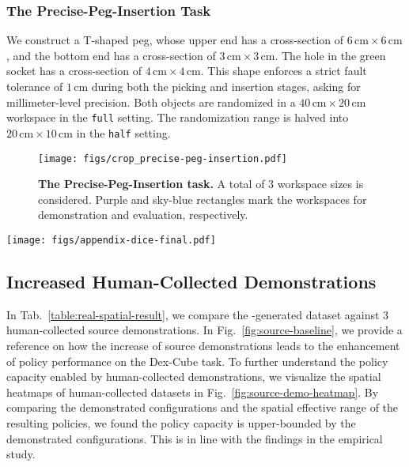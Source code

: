 \begin{appendix}
\vspace{0.2cm}\subsubsection{The Precise-Peg-Insertion Task} 
\label{sec:appendix-empirical-task}
We construct a T-shaped peg, whose upper end has a cross-section of $6\,\textrm{cm} \times 6\,\textrm{cm}$, and the bottom end has a cross-section of $3\,\textrm{cm} \times 3\,\textrm{cm}$. The hole in the green socket has a cross-section of $4\,\textrm{cm} \times 4\,\textrm{cm}$. This shape enforces a strict fault tolerance of $1\,\textrm{cm}$ during both the picking and insertion stages, asking for millimeter-level precision. Both objects are randomized in a $40\,\mathrm{cm} \times 20\,\mathrm{cm}$ workspace in the \texttt{full} setting. The randomization range is halved into $20\,\mathrm{cm} \times 10\,\mathrm{cm}$ in the \texttt{half} setting.


\begin{figure}[h]
    \centering
    \vspace{-0.1cm}
    \texttt{[image: figs/crop\_precise-peg-insertion.pdf]}
    \caption{\textbf{The Precise-Peg-Insertion task.} A total of $3$ workspace sizes is considered. Purple and sky-blue rectangles mark the workspaces for demonstration and evaluation, respectively.}
    \label{fig:precise-peg-insertion}
\end{figure}




\begin{figure*}[t]
    \centering
    \texttt{[image: figs/appendix-dice-final.pdf]}
    \caption{\textbf{Visualization of the policy performance trained on human-collected datasets.} (Upper row) The demonstrated configurations. (Bottom row) The spatial heatmaps with success rates averaged on $5$ trials.}
    \label{fig:source-demo-heatmap}
\end{figure*}



\subsection{Increased Human-Collected Demonstrations}
\label{sec:appendix-increase-source}

In Tab.~\ref{table:real-spatial-result}, we compare the \method-generated dataset against $3$ human-collected source demonstrations. 
In Fig.~\ref{fig:source-baseline}, we provide a reference on how the increase of source demonstrations leads to the enhancement of policy performance on the Dex-Cube task. 
To further understand the policy capacity enabled by human-collected demonstrations, we visualize the spatial heatmaps of human-collected datasets in Fig.~\ref{fig:source-demo-heatmap}. 
By comparing the demonstrated configurations and the spatial effective range of the resulting policies, we found the policy capacity is upper-bounded by the demonstrated configurations.
This is in line with the findings in the empirical study.



\end{appendix}
